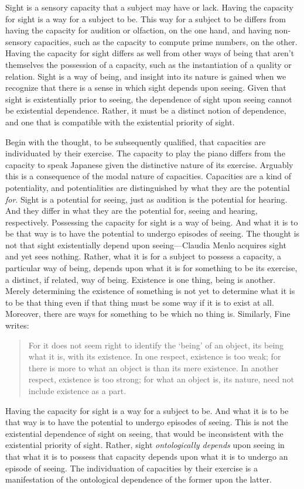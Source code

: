 \documentclass[12pt]{article}
\begin{document}
Sight is a sensory capacity that a subject may have or lack. Having the capacity for sight is a way for a subject to be. This way for a subject to be differs from having the capacity for audition or olfaction, on the one hand, and having non-sensory capacities, such as the capacity to compute prime numbers, on the other. Having the capacity for sight differs as well from other ways of being that aren't themselves the possession of a capacity, such as the instantiation of a quality or relation. Sight is a way of being, and insight into its nature is gained when we recognize that there is a sense in which sight depends upon seeing. Given that sight is existentially prior to seeing, the dependence of sight upon seeing cannot be existential dependence. Rather, it must be a distinct notion of dependence, and one that is compatible with the existential priority of sight.

Begin with the thought, to be subsequently qualified, that capacities are individuated by their exercise. The capacity to play the piano differs from the capacity to speak Japanese given the distinctive nature of its exercise. Arguably this is a consequence of the modal nature of capacities. Capacities are a kind of potentiality, and potentialities are distinguished by what they are the potential \emph{for}. Sight is a potential for seeing, just as audition is the potential for hearing. And they differ in what they are the potential for, seeing and hearing, respectively. Possessing the capacity for sight is a way of being. And what it is to be that way is to have the potential to undergo episodes of seeing. The thought is not that sight existentially depend upon seeing---Claudia Menlo acquires sight and yet sees nothing. Rather, what it is for a subject to possess a capacity, a particular way of being, depends upon what it is for something to be its exercise, a distinct, if related, way of being. Existence is one thing, being is another. Merely determining the existence of something is not yet to determine what it is to be that thing even if that thing must be some way if it is to exist at all. Moreover, there are ways for something to be which no thing is. Similarly, Fine writes:
\begin{quote}
	For it does not seem right to identify the `being' of an object, its being what it is, with its existence. In one respect, existence is too weak; for there is more to what an object is than its mere existence. In another respect, existence is too strong; for what an object is, its nature, need not include existence as a part. \citep[274]{Fine:1995ls}
\end{quote}
Having the capacity for sight is a way for a subject to be. And what it is to be that way is to have the potential to undergo episodes of seeing. This is not the existential dependence of sight on seeing, that would be inconsistent with the existential priority of sight. Rather, sight \emph{ontologically depends} upon seeing in that what it is to possess that capacity depends upon what it is to undergo an episode of seeing. The individuation of capacities by their exercise is a manifestation of the ontological dependence of the former upon the latter.
\end{document}

